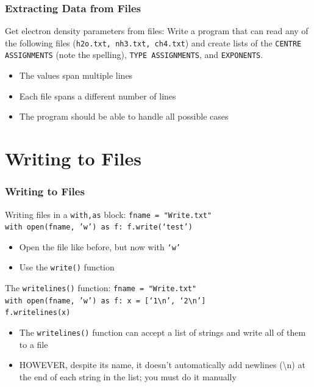 \documentclass{beamer}
\newcommand{\code}[1]{\texttt{#1}}
\newcommand{\tab}{\hspace*{22pt}}
\begin{document}
\begin{frame}	
	\frametitle{Extracting Data from Files}
	
	\begin{exampleblock}{Get electron density parameters from files:}
		Write a program that can read any of the following files (\code{h2o.txt, nh3.txt, ch4.txt}) and create lists of the \code{CENTRE ASSIGNMENTS} (note the spelling), \code{TYPE ASSIGNMENTS}, and \code{EXPONENTS}.
		\begin{itemize}
			\item The values span multiple lines
			\item Each file spans a different number of lines
			\item The program should be able to handle all possible cases
		\end{itemize}		
	\end{exampleblock}
	
\end{frame}


\section{Writing to Files}

\begin{frame}	
\end{frame}

\begin{frame}	
	\frametitle{Writing to Files}
	
	\begin{block}{Writing files in a \code{with,as} block:}
			\code{fname = "Write.txt" \\
					with open(fname, 'w') as f:
					\tab f.write(`test')
			}
		\endminipage\hfill
			\begin{itemize}
				\item Open the file like before, but now with \code{`w'}
				\item Use the \code{write()} function
			\end{itemize}
		\endminipage\hfill
	\end{block}
	
	\begin{block}{The \code{writelines()} function:}
			\code{fname = "Write.txt" \\
					with open(fname, 'w') as f:
					\tab x = [`1\textbackslash n', `2\textbackslash n'] \\
					\tab f.writelines(x)
			}
		\endminipage\hfill
			\begin{itemize}
				\item The \code{writelines()} function can accept a list of strings and write all of them to a file
				\item HOWEVER, despite its name, it doesn't automatically add newlines (\textbackslash n) at the end of each string in the list; you must do it manually
			\end{itemize}
		\endminipage\hfill
	\end{block}
	
\end{frame}
\end{document}
